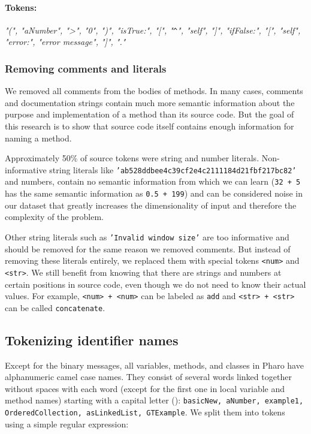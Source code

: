 \paragraph{Tokens:} \textit{"(", "aNumber", ">", "0", ")", "isTrue:", "[", "\lstinline{^}", "self", "]", "ifFalse:", "[", "self", "error:", "error message", "]", "."}

\subsubsection{Removing comments and literals}

We removed all comments from the bodies of methods. In many cases, comments and documentation strings contain much more semantic information about the purpose and implementation of a method than its source code. But the goal of this research is to show that source code itself contains enough information for naming a method.

Approximately 50\% of source tokens were string and number literals. Non-informative string literals like \texttt{'ab528ddbee4c39cf2e4c2111184d21fbf217bc82'} and numbers, contain no semantic information from which we can learn (\lstinline{32 + 5} has the same semantic information as \lstinline{0.5 + 199}) and can be considered noise in our dataset that greatly increases the dimensionality of input and therefore the complexity of the problem.

Other string literals such as \texttt{'Invalid window size'} are too informative and should be removed for the same reason we removed comments. But instead of removing these literals entirely, we replaced them with special tokens \texttt{<num>} and \texttt{<str>}. We still benefit from knowing that there are strings and numbers at certain positions in source code, even though we do not need to know their actual values. For example, \texttt{<num> + <num>} can be labeled as \lstinline{add} and \texttt{<str> + <str>} can be called \lstinline{concatenate}.

\subsection{Tokenizing identifier names}
\label{sec:TranslatingCode-TokenizingNames}

Except for the binary messages, all variables, methods, and classes in Pharo have alphanumeric camel case names. They consist of several words linked together without spaces with each word (except for the first one in local variable and method names) starting with a capital letter (\cite{Blac09}): \texttt{basicNew, aNumber, example1, OrderedCollection, asLinkedList, GTExample}. We split them into tokens using a simple regular expression:

